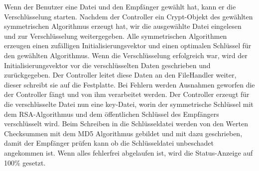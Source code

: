 \documentclass[12pt,a4paper,titlepage]{article}
\begin{document}
Wenn der Benutzer eine Datei und den Empfänger gewählt hat, kann er die Verschlüsselung starten. Nachdem der Controller ein Crypt-Objekt des gewählten symmetrischen Algorithmus erzeugt hat, wir die ausgewählte Datei eingelesen und zur Verschlüsselung weitergegeben. Alle symmetrischen Algorithmen\\ erzeugen einen zufälligen Initialisierungsvektor und einen optimalen Schlüssel für den gewählten Algorithmus. Wenn die Verschlüsselung erfolgreich war, wird der Initialisierungsvektor vor die verschlüsselten Daten geschrieben und zurückgegeben. Der Controller leitet diese Daten an den FileHandler weiter, dieser schreibt sie auf die Festplatte. Bei Fehlern werden Ausnahmen geworfen die der Controller fängt und von ihm verarbeitet werden. Der Controller erzeugt für die verschlüsselte Datei nun eine key-Datei, worin der symmetrische Schlüssel mit dem RSA-Algorithmus und dem öffentlichen Schlüssel des Empfängers verschlüsselt wird. Beim Schreiben in die Schlüsseldatei werden von den Werten Checksummen mit dem MD5 Algorithmus gebildet und mit dazu geschrieben, damit der Empfänger prüfen kann ob die Schlüsseldatei unbeschadet angekommen ist. Wenn alles fehlerfrei abgelaufen ist, wird die Status-Anzeige auf 100\% gesetzt.
\end{document}
